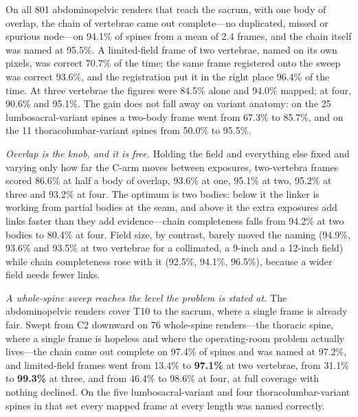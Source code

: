 \documentclass[11pt,letterpaper]{article}
\begin{document}
On all 801 abdominopelvic renders that reach the sacrum, with one body of overlap, the chain of vertebrae came out complete---no duplicated, missed or spurious node---on 94.1\% of spines from a mean of 2.4 frames, and the chain itself was named at 95.5\%. A limited-field frame of two vertebrae, named on its own pixels, was correct 70.7\% of the time; the same frame registered onto the sweep was correct 93.6\%, and the registration put it in the right place 96.4\% of the time. At three vertebrae the figures were 84.5\% alone and 94.0\% mapped; at four, 90.6\% and 95.1\%. The gain does not fall away on variant anatomy: on the 25 lumbosacral-variant spines a two-body frame went from 67.3\% to 85.7\%, and on the 11 thoracolumbar-variant spines from 50.0\% to 95.5\%.

\emph{Overlap is the knob, and it is free.} Holding the field and everything else fixed and varying only how far the C-arm moves between exposures, two-vertebra frames scored 86.6\% at half a body of overlap, 93.6\% at one, 95.1\% at two, 95.2\% at three and 93.2\% at four. The optimum is two bodies: below it the linker is working from partial bodies at the seam, and above it the extra exposures add links faster than they add evidence---chain completeness falls from 94.2\% at two bodies to 80.4\% at four. Field size, by contrast, barely moved the naming (94.9\%, 93.6\% and 93.5\% at two vertebrae for a collimated, a 9-inch and a 12-inch field) while chain completeness rose with it (92.5\%, 94.1\%, 96.5\%), because a wider field needs fewer links.

\emph{A whole-spine sweep reaches the level the problem is stated at.} The abdominopelvic renders cover T10 to the sacrum, where a single frame is already fair. Swept from C2 downward on 76 whole-spine renders---the thoracic spine, where a single frame is hopeless and where the operating-room problem actually lives---the chain came out complete on 97.4\% of spines and was named at 97.2\%, and limited-field frames went from 13.4\% to \textbf{97.1\%} at two vertebrae, from 31.1\% to \textbf{99.3\%} at three, and from 46.4\% to 98.6\% at four, at full coverage with nothing declined. On the five lumbosacral-variant and four thoracolumbar-variant spines in that set every mapped frame at every length was named correctly.
\end{document}
